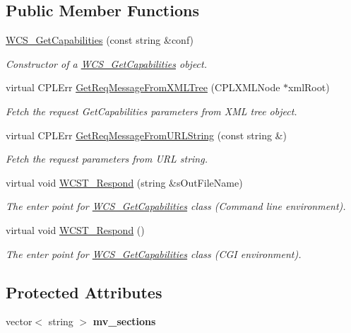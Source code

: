\subsection*{Public Member Functions}
\begin{DoxyCompactItemize}
\item 
\hyperlink{classWCS__GetCapabilities_a305c85654f218ad2e30e763b0e173cb1}{WCS\_\-GetCapabilities} (const string \&conf)
\begin{DoxyCompactList}\small\item\em Constructor of a \hyperlink{classWCS__GetCapabilities}{WCS\_\-GetCapabilities} object. \end{DoxyCompactList}\item 
virtual CPLErr \hyperlink{classWCS__GetCapabilities_ad640c177b1cc20859640090adc608d3e}{GetReqMessageFromXMLTree} (CPLXMLNode $\ast$xmlRoot)
\begin{DoxyCompactList}\small\item\em Fetch the request GetCapabilities parameters from XML tree object. \end{DoxyCompactList}\item 
virtual CPLErr \hyperlink{classWCS__GetCapabilities_a5e0c27a53f396893afd5f796e7c38ee0}{GetReqMessageFromURLString} (const string \&)
\begin{DoxyCompactList}\small\item\em Fetch the request parameters from URL string. \end{DoxyCompactList}\item 
virtual void \hyperlink{classWCS__GetCapabilities_a5da60bec7f2ebce37b1acbcea547cf1d}{WCST\_\-Respond} (string \&sOutFileName)
\begin{DoxyCompactList}\small\item\em The enter point for \hyperlink{classWCS__GetCapabilities}{WCS\_\-GetCapabilities} class (Command line environment). \end{DoxyCompactList}\item 
virtual void \hyperlink{classWCS__GetCapabilities_af250d7ecba600be323a1eb6778bdd4e7}{WCST\_\-Respond} ()
\begin{DoxyCompactList}\small\item\em The enter point for \hyperlink{classWCS__GetCapabilities}{WCS\_\-GetCapabilities} class (CGI environment). \end{DoxyCompactList}\end{DoxyCompactItemize}
\subsection*{Protected Attributes}
\begin{DoxyCompactItemize}
\item 
\hypertarget{classWCS__GetCapabilities_a3ffc84e44c2bad1dc5cf048d9c787719}{
vector$<$ string $>$ {\bfseries mv\_\-sections}}
\label{classWCS__GetCapabilities_a3ffc84e44c2bad1dc5cf048d9c787719}

\end{DoxyCompactItemize}


